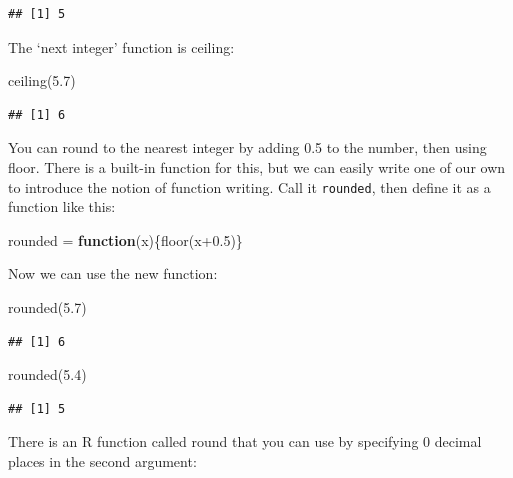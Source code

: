 \documentclass[
]{book}
\newenvironment{Shaded}{\begin{snugshade}}{\end{snugshade}}
\newcommand{\ControlFlowTok}[1]{\textcolor[rgb]{0.13,0.29,0.53}{\textbf{#1}}}
\newcommand{\FloatTok}[1]{\textcolor[rgb]{0.00,0.00,0.81}{#1}}
\newcommand{\FunctionTok}[1]{\textcolor[rgb]{0.00,0.00,0.00}{#1}}
\newcommand{\NormalTok}[1]{#1}
\newcommand{\OtherTok}[1]{\textcolor[rgb]{0.56,0.35,0.01}{#1}}
\begin{document}
\begin{verbatim}
## [1] 5
\end{verbatim}

The `next integer' function is ceiling:

\begin{Shaded}
\begin{Highlighting}[]
\FunctionTok{ceiling}\NormalTok{(}\FloatTok{5.7}\NormalTok{)}
\end{Highlighting}
\end{Shaded}

\begin{verbatim}
## [1] 6
\end{verbatim}

You can round to the nearest integer by adding 0.5 to the number, then using floor. There is a built-in function for this, but we can easily write one of our own to introduce the notion of function writing. Call it \texttt{rounded}, then define it as a function like this:

\begin{Shaded}
\begin{Highlighting}[]
\NormalTok{rounded }\OtherTok{=} \ControlFlowTok{function}\NormalTok{(x)\{}\FunctionTok{floor}\NormalTok{(x}\FloatTok{+0.5}\NormalTok{)\}}
\end{Highlighting}
\end{Shaded}

Now we can use the new function:

\begin{Shaded}
\begin{Highlighting}[]
\FunctionTok{rounded}\NormalTok{(}\FloatTok{5.7}\NormalTok{)}
\end{Highlighting}
\end{Shaded}

\begin{verbatim}
## [1] 6
\end{verbatim}

\begin{Shaded}
\begin{Highlighting}[]
\FunctionTok{rounded}\NormalTok{(}\FloatTok{5.4}\NormalTok{)}
\end{Highlighting}
\end{Shaded}

\begin{verbatim}
## [1] 5
\end{verbatim}

There is an R function called round that you can use by specifying 0 decimal places in the second
argument:
\end{document}
